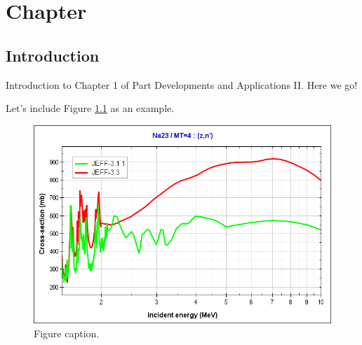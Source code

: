 \chapter{Chapter}
\label{sect:devs02_chapter1}

\section{Introduction}
\label{sect::devs02_chapter1_intro}

Introduction to Chapter 1 of Part Developments and Applications II. Here we go!

Let's include Figure \ref{fig::figure01} as an example.

\begin{figure}[h!]
	\begin{center}
		\includegraphics[width=1\textwidth]{TeX_files/Methodology/Figures/na23-mt4-XS-jeff33-jeff311.png}
		\caption{Figure caption.}
		\label{fig::figure01}
	\end{center}
\end{figure}